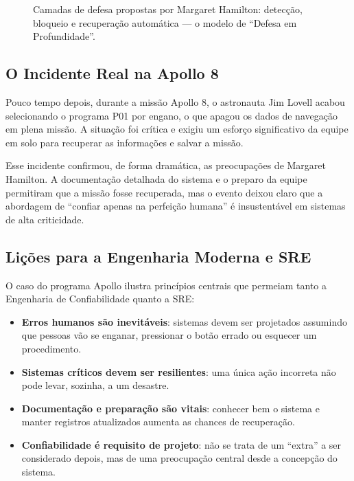 \documentclass[12pt,a4paper,twoside]{report}
\begin{document}
\begin{figure}[h]
\caption{Camadas de defesa propostas por Margaret Hamilton: detecção, bloqueio e recuperação automática --- o modelo de ``Defesa em Profundidade''.}
\label{fig:defesa_profundidade}
\end{figure}

\subsection{O Incidente Real na Apollo 8}

Pouco tempo depois, durante a missão Apollo 8, o astronauta Jim Lovell
acabou selecionando o programa P01 por engano, o que apagou os dados de
navegação em plena missão. A situação foi crítica e exigiu um esforço
significativo da equipe em solo para recuperar as informações e salvar a
missão.

Esse incidente confirmou, de forma dramática, as preocupações de Margaret
Hamilton. A documentação detalhada do sistema e o preparo da equipe
permitiram que a missão fosse recuperada, mas o evento deixou claro que a
abordagem de ``confiar apenas na perfeição humana'' é insustentável em
sistemas de alta criticidade.

\subsection{Lições para a Engenharia Moderna e SRE}

O caso do programa Apollo ilustra princípios centrais que permeiam tanto a
Engenharia de Confiabilidade quanto a SRE:
\begin{itemize}[nosep]
    \item \textbf{Erros humanos são inevitáveis}: sistemas devem ser projetados
    assumindo que pessoas vão se enganar, pressionar o botão errado ou esquecer
    um procedimento.
    \item \textbf{Sistemas críticos devem ser resilientes}: uma única ação
    incorreta não pode levar, sozinha, a um desastre.
    \item \textbf{Documentação e preparação são vitais}: conhecer bem o sistema
    e manter registros atualizados aumenta as chances de recuperação.
    \item \textbf{Confiabilidade é requisito de projeto}: não se trata de um
    ``extra'' a ser considerado depois, mas de uma preocupação central desde a
    concepção do sistema.
\end{itemize}
\end{document}
